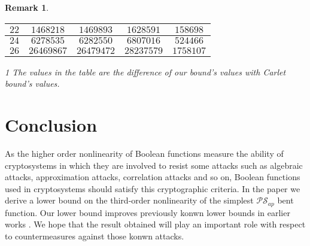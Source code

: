 \documentclass{article}
\newcommand{\0}{\textbf{0}}
\newcommand{\1}{\textbf{1}}
\theoremstyle{plain}
\newtheorem{remark}{Remark}
\begin{document}
\begin{remark}
\begin{table}
\begin{threeparttable}
\begin{tabular}{|c|c|c|c|c|}
                    $22 $ &  $ 1468218     $       & $ 1469893  $     & $ 1628591  $     & $  158698  $ \\  \hline     
                    $24 $ &  $ 6278535     $       & $ 6282550  $     & $ 6807016  $     & $  524466  $ \\  \hline     
                    $26 $ &  $ 26469867    $       & $ 26479472 $     & $ 28237579 $     & $  1758107 $ \\  \hline     
                \end{tabular}       
                \begin{tablenotes}
                    \footnotesize
                    \item[1] The values in the table are the difference of our bound's values with  Carlet bound's values.
                \end{tablenotes}                                     
            \end{threeparttable}
            \label{table:MyTableLabel}                              
        \end{table}    
     \end{remark}
    
\section{Conclusion}
    As the higher order nonlinearity of Boolean functions measure the ability of cryptosystems in which they are involved to resist some attacks such as algebraic attacks, approximation attacks, correlation attacks and so on, Boolean functions used in cryptosystems should satisfy this cryptographic criteria. 
    In the paper we derive a lower bound on the third-order nonlinearity of the simplest $\mathcal{PS}_{ap}$ bent function. 
    Our lower bound improves previously konwn lower bounds in earlier works \cite{TangCT2013NL_2bent,Carlet2011NL_Profile_Dillon}. 
    We hope that the result obtained will play an important role with respect to countermeasures against those konwn attacks. 
    
 

\end{document}

